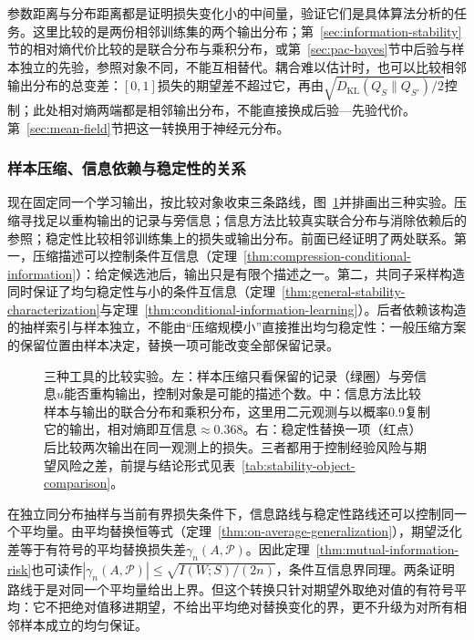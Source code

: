 参数距离与分布距离都是证明损失变化小的中间量，验证它们是具体算法分析的任务。这里比较的是两份相邻训练集的两个输出分布；第~\ref{sec:information-stability}节的相对熵代价比较的是联合分布与乘积分布，或第~\ref{sec:pac-bayes}节中后验与样本独立的先验，参照对象不同，不能互相替代。耦合难以估计时，也可以比较相邻输出分布的总变差：$[0,1]$损失的期望差不超过它，再由$\sqrt{D_{\mathrm{KL}}(Q_S\|Q_{S'})/2}$控制；此处相对熵两端都是相邻输出分布，不能直接换成后验—先验代价。第~\ref{sec:mean-field}节把这一转换用于神经元分布。
\subsubsection{样本压缩、信息依赖与稳定性的关系}
\label{sec:stability-comparison}

现在固定同一个学习输出，按比较对象收束三条路线，图~\ref{fig:lt7-compression-information-stability}并排画出三种实验。压缩寻找足以重构输出的记录与旁信息；信息方法比较真实联合分布与消除依赖后的参照；稳定性比较相邻训练集上的损失或输出分布。前面已经证明了两处联系。第一，压缩描述可以控制条件互信息（定理~\ref{thm:compression-conditional-information}）：给定候选池后，输出只是有限个描述之一。第二，共同子采样构造同时保证了均匀稳定性与小的条件互信息（定理~\ref{thm:general-stability-characterization}与定理~\ref{thm:conditional-information-learning}）。后者依赖该构造的抽样索引与样本独立，不能由“压缩规模小”直接推出均匀稳定性：一般压缩方案的保留位置由样本决定，替换一项可能改变全部保留记录。

\begin{figure}[htbp]
 \centering
 
 \caption{三种工具的比较实验。左：样本压缩只看保留的记录（绿圈）与旁信息$u$能否重构输出，控制对象是可能的描述个数。中：信息方法比较样本与输出的联合分布和乘积分布，这里用二元观测与以概率0.9复制它的输出，相对熵即互信息$\approx0.368$。右：稳定性替换一项（红点）后比较两次输出在同一观测上的损失。三者都用于控制经验风险与期望风险之差，前提与结论形式见表~\ref{tab:stability-object-comparison}。}
 \label{fig:lt7-compression-information-stability}
\end{figure}

在独立同分布抽样与当前有界损失条件下，信息路线与稳定性路线还可以控制同一个平均量。由平均替换恒等式（定理~\ref{thm:on-average-generalization}），期望泛化差等于有符号的平均替换损失差$\gamma_n(A,\mathcal P)$。因此定理~\ref{thm:mutual-information-risk}也可读作$|\gamma_n(A,\mathcal P)|\leq\sqrt{I(W;S)/(2n)}$，条件互信息界同理。两条证明路线于是对同一个平均量给出上界。但这个转换只针对期望外取绝对值的有符号平均：它不把绝对值移进期望，不给出平均绝对替换变化的界，更不升级为对所有相邻样本成立的均匀保证。

